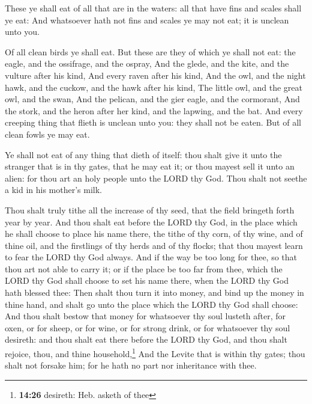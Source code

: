  These ye shall eat of all that are in the waters: all
that have fins and scales shall ye eat:  And whatsoever
hath not fins and scales ye may not eat; it is unclean unto you.

 Of all clean birds ye shall eat.  But
these are they of which ye shall not eat: the eagle, and the ossifrage,
and the ospray,  And the glede, and the kite, and the
vulture after his kind,  And every raven after his kind,
 And the owl, and the night hawk, and the cuckow, and the
hawk after his kind,  The little owl, and the great owl,
and the swan,  And the pelican, and the gier eagle, and
the cormorant,  And the stork, and the heron after her
kind, and the lapwing, and the bat.  And every creeping
thing that flieth is unclean unto you: they shall not be eaten.
 But of all clean fowls ye may eat.

 Ye shall not eat of any thing that dieth of itself: thou
shalt give it unto the stranger that is in thy gates, that he may eat
it; or thou mayest sell it unto an alien: for thou art an holy people
unto the LORD thy God. Thou shalt not seethe a kid in his mother's milk.

 Thou shalt truly tithe all the increase of thy seed,
that the field bringeth forth year by year.  And thou
shalt eat before the LORD thy God, in the place which he shall choose to
place his name there, the tithe of thy corn, of thy wine, and of thine
oil, and the firstlings of thy herds and of thy flocks; that thou mayest
learn to fear the LORD thy God always.  And if the way be
too long for thee, so that thou art not able to carry it; or if the
place be too far from thee, which the LORD thy God shall choose to set
his name there, when the LORD thy God hath blessed thee: 
Then shalt thou turn it into money, and bind up the money in thine hand,
and shalt go unto the place which the LORD thy God shall choose:
 And thou shalt bestow that money for whatsoever thy soul
lusteth after, for oxen, or for sheep, or for wine, or for strong drink,
or for whatsoever thy soul desireth: and thou shalt eat there before the
LORD thy God, and thou shalt rejoice, thou, and thine
household,\footnote{\textbf{14:26} desireth: Heb. asketh of thee}
 And the Levite that is within thy gates; thou shalt not
forsake him; for he hath no part nor inheritance with thee.

